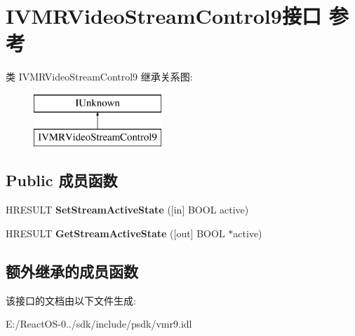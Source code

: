 \hypertarget{interface_i_v_m_r_video_stream_control9}{}\section{I\+V\+M\+R\+Video\+Stream\+Control9接口 参考}
\label{interface_i_v_m_r_video_stream_control9}
类 I\+V\+M\+R\+Video\+Stream\+Control9 继承关系图\+:\begin{figure}[H]
\begin{center}
\leavevmode
\includegraphics[height=2.000000cm]{interface_i_v_m_r_video_stream_control9}
\end{center}
\end{figure}
\subsection*{Public 成员函数}
\begin{DoxyCompactItemize}
\item 
\mbox{\label{interface_i_v_m_r_video_stream_control9_ac7a6e803ce2c2a9595894e5edbd08f3b}} 
H\+R\+E\+S\+U\+LT {\bfseries Set\+Stream\+Active\+State} (\mbox{[}in\mbox{]} B\+O\+OL active)
\item 
\mbox{\label{interface_i_v_m_r_video_stream_control9_a0f4e3ae4dbf026bb1ac09e6f05b0025d}} 
H\+R\+E\+S\+U\+LT {\bfseries Get\+Stream\+Active\+State} (\mbox{[}out\mbox{]} B\+O\+OL $\ast$active)
\end{DoxyCompactItemize}
\subsection*{额外继承的成员函数}


该接口的文档由以下文件生成\+:\begin{DoxyCompactItemize}
\item 
E\+:/\+React\+O\+S-\/0../sdk/include/psdk/vmr9.\+idl\end{DoxyCompactItemize}
